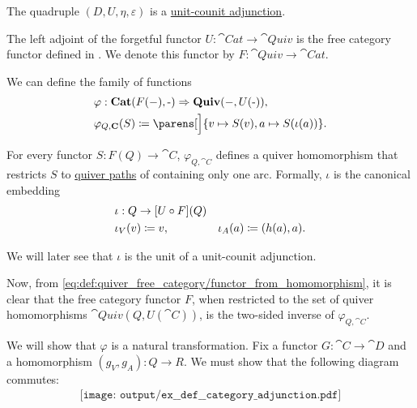 \begin{example}
\begin{thmenum}
    The quadruple \( (D, U, \eta, \varepsilon) \) is a \hyperref[def:category_adjunction/unit_counit]{unit-counit adjunction}.

     The left adjoint of the forgetful functor \( U: \cat{Cat} \to \cat{Quiv} \) is the free category functor defined in . We denote this functor by \( F: \cat{Quiv} \to \cat{Cat} \).

    We can define the family of functions
    \begin{equation}\label{eq:ex:def:category_adjunction/quiv_cat/varphi_family}
      \begin{aligned}
        &\varphi: \cat{Cat}(F(\anon*), \cat{\anon*}) \Rightarrow \cat{Quiv}(\anon*, U(\cat{\anon*})), \\
        &\varphi_{Q, \cat{C}}(S) \coloneqq \parens[\Big]{ v \mapsto S(v), a \mapsto S(\iota(a)) }.
      \end{aligned}
    \end{equation}

    For every functor \( S: F(Q) \to \cat{C} \), \( \varphi_{Q, \cat{C}} \) defines a quiver homomorphism that restricts \( S \) to \hyperref[def:quiver_path]{quiver paths} of containing only one arc. Formally, \( \iota \) is the canonical embedding
    \begin{equation*}
      \begin{aligned}
        &\iota: Q \to [U \bincirc F](Q) \\
        &\iota_V(v) \coloneqq v,
        &\iota_A(a) \coloneqq (h(a), a).
      \end{aligned}
    \end{equation*}

    We will later see that \( \iota \) is the unit of a unit-counit adjunction.

    Now, from \eqref{eq:def:quiver_free_category/functor_from_homomorphism}, it is clear that the free category functor \( F \), when restricted to the set of quiver homomorphisms \( \cat{Quiv}(Q, U(\cat{C})) \), is the two-sided inverse of \( \varphi_{Q, \cat{C}} \).

    We will show that \( \varphi \) is a natural transformation. Fix a functor \( G: \cat{C} \to \cat{D} \) and a homomorphism \( (g_V, g_A): Q \to R \). We must show that the following diagram commutes:
    \begin{equation}\label{eq:ex:def:category_adjunction/quiv_cat/varphi_nat}
      \begin{aligned}
        \texttt{[image: output/ex\_\_def\_\_category\_adjunction.pdf]}
      \end{aligned}
    \end{equation}


\end{thmenum}
\end{example}

